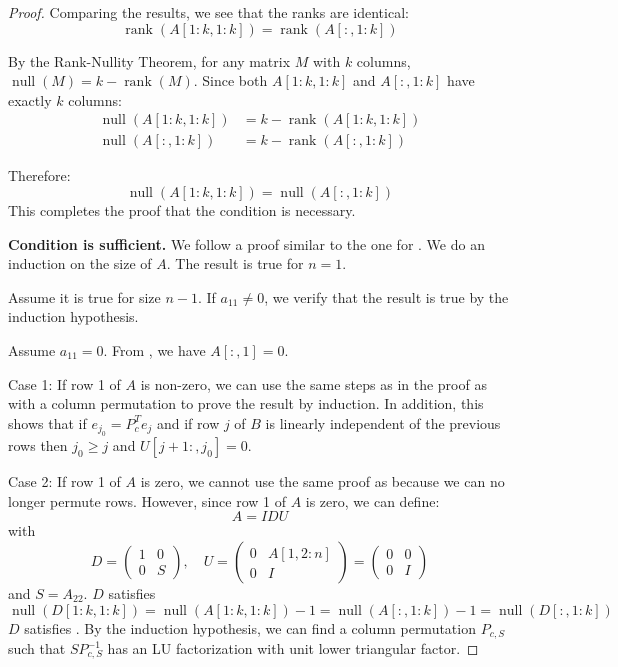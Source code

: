 \documentclass{article}
\DeclareMathOperator{\rk}{rank}
\DeclareMathOperator{\nl}{null}
\begin{document}
\begin{proof}
    Comparing the results, we see that the ranks are identical:
    \[ \rk(A[1:k, 1:k]) = \rk(A[:, 1:k]) \]

    By the Rank-Nullity Theorem, for any matrix $M$ with $k$ columns, $\nl(M) = k - \rk(M)$. Since both $A[1:k, 1:k]$ and $A[:, 1:k]$ have exactly $k$ columns:
    \begin{align*}
        \nl(A[1:k, 1:k]) & = k - \rk(A[1:k, 1:k]) \\
        \nl(A[:, 1:k])   & = k - \rk(A[:, 1:k])
    \end{align*}

    Therefore:
    \[ \nl(A[1:k, 1:k]) = \nl(A[:, 1:k]) \]
    This completes the proof that the condition is necessary.

    \noindent\textbf{Condition is sufficient.} \quad We follow a proof similar to the one for . We do an induction on the size of $A$. The result is true for $n=1$.

    Assume it is true for size $n-1$. If $a_{11} \neq 0$, we verify that the result is true by the induction hypothesis.

    Assume $a_{11} = 0$. From , we have $A[:,1] = 0$.

    Case 1: If row 1 of $A$ is non-zero, we can use the same steps as in the proof as  with a column permutation to prove the result by induction. In addition, this shows that if $e_{j_0} = P_c^T e_j$ and if row $j$ of $B$ is linearly independent of the previous rows then $j_0 \ge j$ and $U[j+1:,j_0] = 0$.

    Case 2: If row 1 of $A$ is zero, we cannot use the same proof as  because we can no longer permute rows. However, since row 1 of $A$ is zero, we can define:
    \[
        A = IDU
    \]
    with
    \[
        D = \begin{pmatrix}
            1 & 0 \\
            0 & S
        \end{pmatrix}, \quad
        U = \begin{pmatrix}
            0 & A[1,2:n] \\
            0 & I
        \end{pmatrix} = \begin{pmatrix}
            0 & 0 \\
            0 & I
        \end{pmatrix}
    \]
    and $S=A_{22}$. $D$ satisfies
    \[
        \nl(D[1:k,1:k]) = \nl(A[1:k,1:k]) - 1
        = \nl(A[:,1:k]) - 1 = \nl(D[:,1:k])
    \]
    $D$ satisfies . By the induction hypothesis, we can find a column permutation $P_{c,S}$ such that $S P_{c,S}^{-1}$ has an LU factorization with unit lower triangular factor.


\end{proof}
\end{document}
